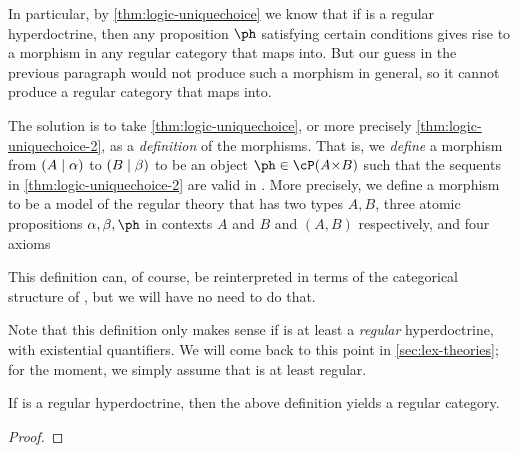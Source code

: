 \begin{wip}
In particular, by \cref{thm:logic-uniquechoice} we know that if \cP is a regular hyperdoctrine, then any proposition $\ph$ satisfying certain conditions gives rise to a morphism in any regular category that \cP maps into.
But our guess in the previous paragraph would not produce such a morphism in general, so it cannot produce a regular category that \cP maps into.

The solution is to take \cref{thm:logic-uniquechoice}, or more precisely \cref{thm:logic-uniquechoice-2}, as a \emph{definition} of the morphisms.
That is, we \emph{define} a morphism from $(A\mid\alpha)$ to $(B\mid\beta)$ to be an object $\ph\in \cP(A\times B)$ such that the sequents in \cref{thm:logic-uniquechoice-2} are valid in \cP.
More precisely, we define a morphism to be a model of the regular theory that has two types $A,B$, three atomic propositions $\alpha,\beta,\ph$ in contexts $A$ and $B$ and $(A,B)$ respectively, and four axioms
This definition can, of course, be reinterpreted in terms of the categorical structure of \cP, but we will have no need to do that.

Note that this definition only makes sense if \cP is at least a \emph{regular} hyperdoctrine, with existential quantifiers.
We will come back to this point in \cref{sec:lex-theories}; for the moment, we simply assume that \cP is at least regular.

\begin{thm}
  If \cP is a regular hyperdoctrine, then the above definition yields a regular category.
\end{thm}
\begin{proof}
  
\end{proof}




\end{wip}



